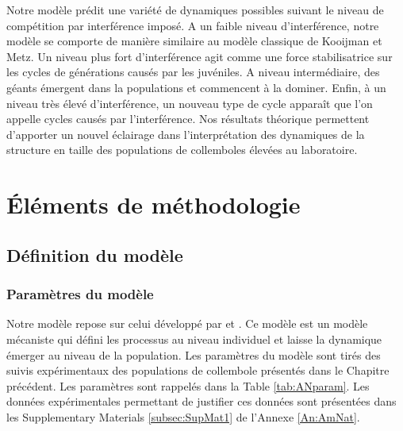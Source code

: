 Notre modèle prédit une variété de dynamiques possibles suivant le niveau de
compétition par interférence imposé. A un faible niveau d'interférence, notre
modèle se comporte de manière similaire au modèle classique de Kooijman et Metz.
Un niveau plus fort d'interférence agit comme une force stabilisatrice sur les
cycles de générations causés par les juvéniles. A niveau intermédiaire, des
géants émergent dans la populations et commencent à la dominer. Enfin, à un
niveau très élevé d'interférence, un nouveau type de cycle apparaît que l'on
appelle cycles causés par l'interférence. Nos résultats théorique permettent
d'apporter un nouvel éclairage dans l'interprétation des dynamiques de la
structure en taille des populations de collemboles élevées au laboratoire.

\section{Éléments de méthodologie}


\subsection{Définition du modèle}

\subsubsection{Paramètres du modèle}

Notre modèle repose sur celui développé par
\textcites[KM-model][]{kooijman1984a} et \textcites{de-roos1992a}. Ce modèle
est un modèle mécaniste qui défini les processus au niveau individuel et laisse
la dynamique émerger au niveau de la population. Les paramètres du
modèle sont tirés des suivis expérimentaux des populations de collembole
présentés dans le Chapitre précédent. Les paramètres sont rappelés dans la Table
\ref{tab:ANparam}. Les données expérimentales permettant de justifier ces
données sont présentées dans les Supplementary Materials \ref{subsec:SupMat1} de
l'Annexe \ref{An:AmNat}. 

